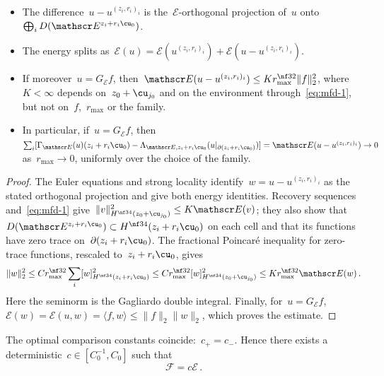 \documentclass[11pt]{amsart}
\begin{document}
\begin{lemma}
\label{mfd:lem-replace}
\begin{itemize}
\item The difference~$u-u^{(z_i,r_i)_i}$ is the~$\mathscr E$-orthogonal projection of~$u$ onto~$\bigoplus_iD(\mathscr E^{z_i+r_i\cu_0})$.
\item The energy splits as~$\mathscr E(u)=\mathscr E(u^{(z_i,r_i)_i})+\mathscr E(u-u^{(z_i,r_i)_i})$.
\item If moreover~$u=G_{\mathscr E}f$, then~$\mathscr E(u-u^{(z_i,r_i)_i})\leq Kr_{\max}^{\nf32}\|f\|_2^2$, where~$K<\infty$ depends on~$z_0+\cu_{j_0}$ and on the environment through~\eqref{eq:mfd-1}, but not on~$f$,~$r_{\max}$ or the family.
\item In particular, if~$u=G_{\mathscr E}f$, then~$\sum_i[\Gamma_{\mathscr E}(u)(z_i+r_i\cu_0)-\Lambda_{\mathscr E,z_i+r_i\cu_0}(u|_{\partial(z_i+r_i\cu_0)})] =\mathscr E(u-u^{(z_i,r_i)_i})\to0$ as~$r_{\max}\to0$, uniformly over the choice of the family.
\end{itemize}
\end{lemma}

\begin{proof}
The Euler equations and strong locality identify~$w=u-u^{(z_i,r_i)_i}$ as the stated orthogonal projection and give both energy identities. Recovery sequences and~\eqref{eq:mfd-1} give~$\|v\|_{H^{\nf34}(z_0+\cu_{j_0})}^2\leq K\mathscr E(v)$; they also show that~$D(\mathscr E^{z_i+r_i\cu_0})\subset H^{\nf34}(z_i+r_i\cu_0)$ on each cell and that its functions have zero trace on~$\partial(z_i+r_i\cu_0)$. The fractional Poincar\'e inequality for zero-trace functions, rescaled to~$z_i+r_i\cu_0$, gives
\begin{equation*}
	\|w\|_2^2
	\leq Cr_{\max}^{\nf32}\sum_i[w]_{H^{\nf34}(z_i+r_i\cu_0)}^2
	\leq Cr_{\max}^{\nf32}[w]_{H^{\nf34}(z_0+\cu_{j_0})}^2
	\leq Kr_{\max}^{\nf32}\mathscr E(w)\,.
\end{equation*}
Here the seminorm is the Gagliardo double integral. Finally, for~$u=G_{\mathscr E}f$,~$\mathscr E(w)=\mathscr E(u,w)=\langle f,w\rangle\leq\|f\|_2\|w\|_2$, which proves the estimate.
\end{proof}

\begin{theorem}[Proportionality]
\label{mfd:thm-prop}
The optimal comparison constants coincide:~$c_+=c_-$. Hence there exists a deterministic~$c\in[C_0^{-1},C_0]$ such that
\begin{equation}
	\mathscr F=c\mathscr E\,.
	\label{eq:mfd-36}
\end{equation}
\end{theorem}
\end{document}
